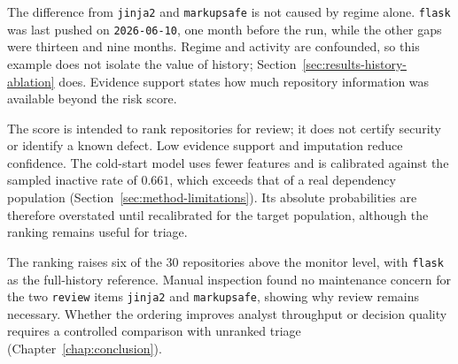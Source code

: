 The difference from \texttt{jinja2} and \texttt{markupsafe} is not caused by
regime alone. \texttt{flask} was last pushed on \texttt{2026-06-10}, one month
before the run, while the other gaps were thirteen and nine months. Regime and
activity are confounded, so this example does not isolate the value of history;
Section~\ref{sec:results-history-ablation} does. Evidence support states how much
repository information was available beyond the risk score.

The score is intended to rank repositories for review; it does not certify
security or identify a known defect. Low evidence support and imputation reduce
confidence. The cold-start model uses fewer features and is calibrated against
the sampled inactive rate of \(0.661\), which exceeds that of a real dependency
population (Section~\ref{sec:method-limitations}). Its absolute probabilities are
therefore overstated until recalibrated for the target population, although the
ranking remains useful for triage.

The ranking raises six of the 30 repositories above the monitor level, with
\texttt{flask} as the full-history reference. Manual inspection found no
maintenance concern for the two
\texttt{review} items \texttt{jinja2} and \texttt{markupsafe}, showing why
review remains necessary. Whether the ordering improves analyst throughput or
decision quality requires a controlled comparison with unranked triage
(Chapter~\ref{chap:conclusion}).
